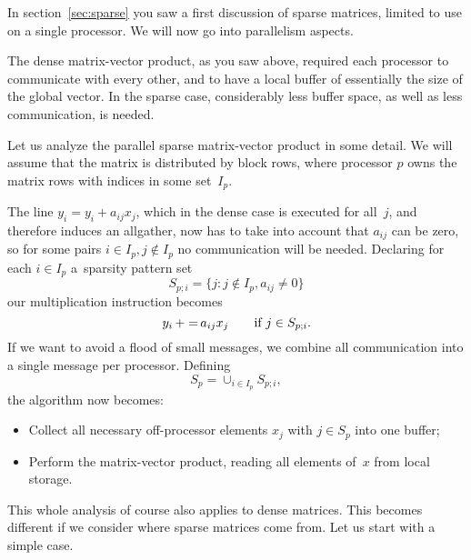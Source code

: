 
In section~\ref{sec:sparse} you saw a first discussion of sparse
matrices, limited to use on a single processor. We will now go into
parallelism aspects.

The dense matrix-vector product, as you saw above,
required each processor to communicate with every other, and to have a
local buffer of essentially the size of the global vector. In the
sparse case, considerably less buffer space, as well as less
communication, is needed.

Let us analyze the parallel sparse matrix-vector product in some detail.
We will assume
that the matrix is distributed by block rows, where processor $p$ owns
the matrix rows with indices in some set~$I_p$.

The line $y_i=y_i+a_{ij}x_j$,
which in the dense case is executed for all~$j$,
and therefore induces an allgather,
now has to take into account that $a_{ij}$
can be zero,
so for some pairs $i\in I_p, j\not\in I_p$
no communication will be needed.
Declaring
for each $i\in I_p$ a~sparsity pattern set
\[ S_{p;i}=\{j\colon j\not\in I_p, a_{ij}\not=0\} \]
our multiplication instruction becomes
\[ y_i\mathop{+=}a_{ij}x_j\qquad\hbox{if $j\in S_{p;i}$}. \]
If we want to avoid a flood of small messages, we combine
all communication into a single message per processor. Defining
\[ S_p = \cup_{i\in I_p} S_{p;i}, \]
the algorithm now becomes:
\begin{itemize}
\item Collect all necessary off-processor elements $x_j$ with $j\in
  S_p$ into one buffer;
\item Perform the matrix-vector product, reading all elements of~$x$
  from local storage.
\end{itemize}

This whole analysis of course also applies to dense matrices. This
becomes different if we consider where sparse matrices come from.  Let
us start with a simple case.

